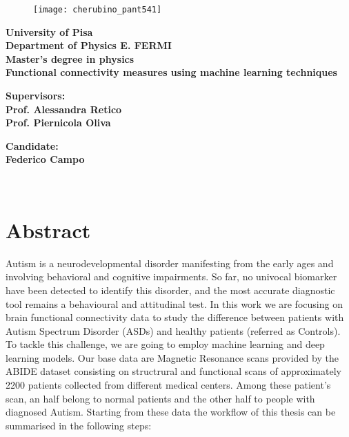 \documentclass[10pt]{report}
\author{Federico}
\begin{document}
\begin{titlepage}
\begin{figure}[t]
\centering
\texttt{[image: cherubino\_pant541]}
\end{figure}

\begin{center}
	\textbf{University of Pisa \\ Department of Physics E. FERMI\\ Master's degree in physics\\}
	\vspace{20mm}
    {\LARGE{\bf Functional connectivity measures using machine learning techniques}}
\end{center}

\vspace{36mm}
\begin{minipage}[t]{0.47\textwidth}
	{\large{\bf Supervisors:\\ Prof. Alessandra Retico\\ Prof. Piernicola Oliva}}
\end{minipage}\hfill\begin{minipage}[t]{0.47\textwidth}\raggedleft
	{\large{\bf Candidate: \\ Federico Campo}}
\end{minipage}

\vspace{60mm}
\hrulefill
\\

\end{titlepage}


\tableofcontents

\chapter*{Abstract}

Autism is a neurodevelopmental disorder manifesting from the early ages and involving behavioral and cognitive impairments. So far, no univocal biomarker have been detected to identify this disorder, and the most accurate diagnostic tool remains a behavioural and attitudinal test.
In this work we are focusing on brain functional connectivity data to study the difference between patients with Autism Spectrum Disorder (ASDs) and healthy patients (referred as Controls). To tackle this challenge, we are going to employ machine learning and deep learning models.
Our base data are Magnetic Resonance scans provided by the ABIDE dataset consisting on structrural and functional scans of approximately 2200 patients collected from different medical centers.
Among these patient's scan, an half belong to normal patients and the other half to people with diagnosed Autism.
Starting from these data the workflow of this thesis can be summarised in the following steps:
\end{document}
